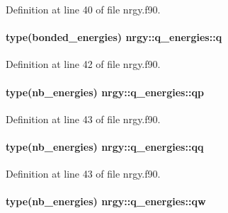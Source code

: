 Definition at line 40 of file nrgy.\-f90.

\hypertarget{structnrgy_1_1q__energies_a841e639b4b7b12fecc90ba16c1f9b76c}{
\paragraph[{q}]{\setlength{\rightskip}{0pt plus 5cm}type({\bf bonded\-\_\-energies}) nrgy\-::q\-\_\-energies\-::q}}\label{structnrgy_1_1q__energies_a841e639b4b7b12fecc90ba16c1f9b76c}


Definition at line 42 of file nrgy.\-f90.

\hypertarget{structnrgy_1_1q__energies_a88ca83ee99191c71525dc53260d0a481}{
\paragraph[{qp}]{\setlength{\rightskip}{0pt plus 5cm}type({\bf nb\-\_\-energies}) nrgy\-::q\-\_\-energies\-::qp}}\label{structnrgy_1_1q__energies_a88ca83ee99191c71525dc53260d0a481}


Definition at line 43 of file nrgy.\-f90.

\hypertarget{structnrgy_1_1q__energies_a6fcead6abfbf219f96c21652fc29db9d}{
\paragraph[{qq}]{\setlength{\rightskip}{0pt plus 5cm}type({\bf nb\-\_\-energies}) nrgy\-::q\-\_\-energies\-::qq}}\label{structnrgy_1_1q__energies_a6fcead6abfbf219f96c21652fc29db9d}


Definition at line 43 of file nrgy.\-f90.

\hypertarget{structnrgy_1_1q__energies_ad0788f64e5d28e57f3bf465aa881d7c7}{
\paragraph[{qw}]{\setlength{\rightskip}{0pt plus 5cm}type({\bf nb\-\_\-energies}) nrgy\-::q\-\_\-energies\-::qw}}\label{structnrgy_1_1q__energies_ad0788f64e5d28e57f3bf465aa881d7c7}


